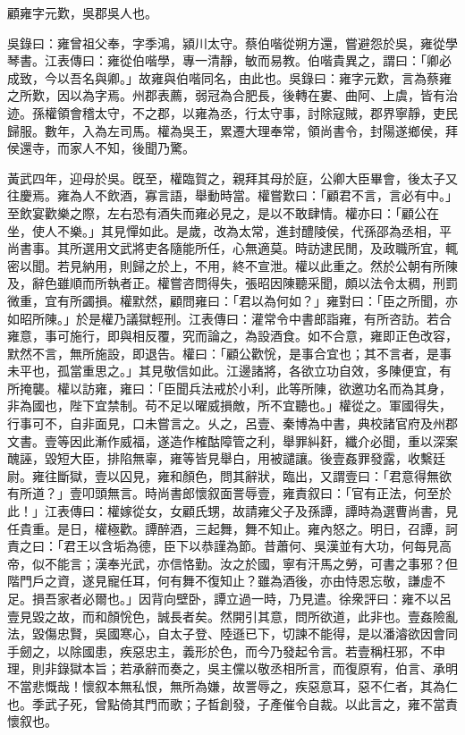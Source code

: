 
\begin{pinyinscope}
顧雍字元歎，吳郡吳人也。

吳錄曰：雍曾祖父奉，字季鴻，潁川太守。蔡伯喈從朔方還，嘗避怨於吳，雍從學琴書。江表傳曰：雍從伯喈學，專一清靜，敏而易教。伯喈貴異之，謂曰：「卿必成致，今以吾名與卿。」故雍與伯喈同名，由此也。吳錄曰：雍字元歎，言為蔡雍之所歎，因以為字焉。州郡表薦，弱冠為合肥長，後轉在婁、曲阿、上虞，皆有治迹。孫權領會稽太守，不之郡，以雍為丞，行太守事，討除寇賊，郡界寧靜，吏民歸服。數年，入為左司馬。權為吳王，累遷大理奉常，領尚書令，封陽遂鄉侯，拜侯還寺，而家人不知，後聞乃驚。

黃武四年，迎母於吳。旣至，權臨賀之，親拜其母於庭，公卿大臣畢會，後太子又往慶焉。雍為人不飲酒，寡言語，舉動時當。權嘗歎曰：「顧君不言，言必有中。」至飲宴歡樂之際，左右恐有酒失而雍必見之，是以不敢肆情。權亦曰：「顧公在坐，使人不樂。」其見憚如此。是歲，改為太常，進封醴陵侯，代孫邵為丞相，平尚書事。其所選用文武將吏各隨能所任，心無適莫。時訪逮民閒，及政職所宜，輒密以聞。若見納用，則歸之於上，不用，終不宣泄。權以此重之。然於公朝有所陳及，辭色雖順而所執者正。權嘗咨問得失，張昭因陳聽采聞，頗以法令太稠，刑罰微重，宜有所蠲損。權默然，顧問雍曰：「君以為何如？」雍對曰：「臣之所聞，亦如昭所陳。」於是權乃議獄輕刑。江表傳曰：灌常令中書郎詣雍，有所咨訪。若合雍意，事可施行，即與相反覆，究而論之，為設酒食。如不合意，雍即正色改容，默然不言，無所施設，即退告。權曰：「顧公歡恱，是事合宜也；其不言者，是事未平也，孤當重思之。」其見敬信如此。江邊諸將，各欲立功自效，多陳便宜，有所掩襲。權以訪雍，雍曰：「臣聞兵法戒於小利，此等所陳，欲邀功名而為其身，非為國也，陛下宜禁制。苟不足以曜威損敵，所不宜聽也。」權從之。軍國得失，行事可不，自非面見，口未嘗言之。乆之，呂壹、秦博為中書，典校諸官府及州郡文書。壹等因此漸作威福，遂造作榷酤障管之利，舉罪糾姧，纖介必聞，重以深案醜誣，毀短大臣，排陷無辜，雍等皆見舉白，用被譴讓。後壹姦罪發露，收繫廷尉。雍往斷獄，壹以囚見，雍和顏色，問其辭狀，臨出，又謂壹曰：「君意得無欲有所道？」壹叩頭無言。時尚書郎懷叙面詈辱壹，雍責叙曰：「官有正法，何至於此！」江表傳曰：權嫁從女，女顧氏甥，故請雍父子及孫譚，譚時為選曹尚書，見任貴重。是日，權極歡。譚醉酒，三起舞，舞不知止。雍內怒之。明日，召譚，訶責之曰：「君王以含垢為德，臣下以恭謹為節。昔蕭何、吳漢並有大功，何每見高帝，似不能言；漢奉光武，亦信恪勤。汝之於國，寧有汗馬之勞，可書之事邪？但階門戶之資，遂見寵任耳，何有舞不復知止？雖為酒後，亦由恃恩忘敬，謙虛不足。損吾家者必爾也。」因背向壁卧，譚立過一時，乃見遣。徐衆評曰：雍不以呂壹見毀之故，而和顏恱色，誠長者矣。然開引其意，問所欲道，此非也。壹姦險亂法，毀傷忠賢，吳國寒心，自太子登、陸遜已下，切諫不能得，是以潘濬欲因會同手劒之，以除國患，疾惡忠主，義形於色，而今乃發起令言。若壹稱枉邪，不申理，則非錄獄本旨；若承辭而奏之，吳主儻以敬丞相所言，而復原宥，伯言、承明不當悲慨哉！懷叙本無私恨，無所為嫌，故詈辱之，疾惡意耳，惡不仁者，其為仁也。季武子死，曾點倚其門而歌；子晳創發，子產催令自裁。以此言之，雍不當責懷叙也。


\end{pinyinscope}

